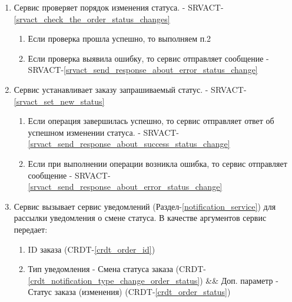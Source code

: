     \begin{alg} \label{alg_order_status_processing} \mbox{}

         \begin{enumerate}

            \item Сервис проверяет порядок изменения статуса. - SRVACT-\ref{srvact_check_the_order_status_changes}

             	\begin{enumerate}

               	\item Если проверка прошла успешно, то выполняем п.2
            
             		\item Если проверка выявила ошибку, то сервис отправляет сообщение - SRVACT-\ref{srvact_send_response_about_error_status_change}

             	\end{enumerate}

            \item Сервис устанавливает заказу запрашиваемый статус. - SRVACT-\ref{srvact_set_new_status}

             	\begin{enumerate}

               	\item Если операция завершилась успешно, то сервис отправляет ответ об успешном изменении статуса. - SRVACT-\ref{srvact_send_response_about_success_status_change}
            
             		\item Если при выполнении операции возникла ошибка, то сервис отправляет сообщение - SRVACT-\ref{srvact_send_response_about_error_status_change}

             	\end{enumerate}

            \item Сервис вызывает сервис уведомлений (Раздел-\ref{notification_service}) для рассылки уведомления о смене статуса. В качестве аргументов сервис передает: 


              \begin{enumerate}

                \item ID заказа (CRDT-\ref{crdt_order_id})
                
                \item Тип уведомления - Смена статуса заказа (CRDT-\ref{crdt_notification_type_change_order_status}) \&\& Доп. параметр - Статус заказа (изменения) (CRDT-\ref{crdt_order_status})

              \end{enumerate}

         \end{enumerate}

         \end{alg}

